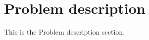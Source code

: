 \section{Problem description}
\label{sec:problem_description}
This is the Problem description section.